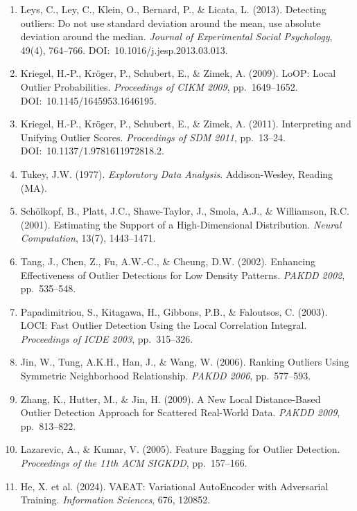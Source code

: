 \documentclass[12pt,a4paper]{article}
\begin{document}
\begin{enumerate}
\item Leys, C., Ley, C., Klein, O., Bernard, P., \& Licata, L. (2013).
Detecting outliers: Do not use standard deviation around the mean, use absolute
deviation around the median. \textit{Journal of Experimental Social Psychology},
49(4), 764--766. DOI:~10.1016/j.jesp.2013.03.013.

\item Kriegel, H.-P., Kröger, P., Schubert, E., \& Zimek, A. (2009). LoOP:
Local Outlier Probabilities. \textit{Proceedings of CIKM 2009}, pp.~1649--1652.
DOI:~10.1145/1645953.1646195.

\item Kriegel, H.-P., Kröger, P., Schubert, E., \& Zimek, A. (2011).
Interpreting and Unifying Outlier Scores. \textit{Proceedings of SDM 2011},
pp.~13--24. DOI:~10.1137/1.9781611972818.2.

\item Tukey, J.W. (1977). \textit{Exploratory Data Analysis}.
Addison-Wesley, Reading (MA).

\item Schölkopf, B., Platt, J.C., Shawe-Taylor, J., Smola, A.J., \&
Williamson, R.C. (2001). Estimating the Support of a High-Dimensional
Distribution. \textit{Neural Computation}, 13(7), 1443--1471.

\item Tang, J., Chen, Z., Fu, A.W.-C., \& Cheung, D.W. (2002). Enhancing
Effectiveness of Outlier Detections for Low Density Patterns. \textit{PAKDD
2002}, pp.~535--548.

\item Papadimitriou, S., Kitagawa, H., Gibbons, P.B., \& Faloutsos, C. (2003).
LOCI: Fast Outlier Detection Using the Local Correlation Integral.
\textit{Proceedings of ICDE 2003}, pp.~315--326.

\item Jin, W., Tung, A.K.H., Han, J., \& Wang, W. (2006). Ranking Outliers
Using Symmetric Neighborhood Relationship. \textit{PAKDD 2006}, pp.~577--593.

\item Zhang, K., Hutter, M., \& Jin, H. (2009). A New Local Distance-Based
Outlier Detection Approach for Scattered Real-World Data. \textit{PAKDD 2009},
pp.~813--822.

\item Lazarevic, A., \& Kumar, V. (2005). Feature Bagging for Outlier
Detection. \textit{Proceedings of the 11th ACM SIGKDD}, pp.~157--166.

\item He, X. et al. (2024). VAEAT: Variational AutoEncoder with Adversarial
Training. \textit{Information Sciences}, 676, 120852.


\end{enumerate}
\end{document}
